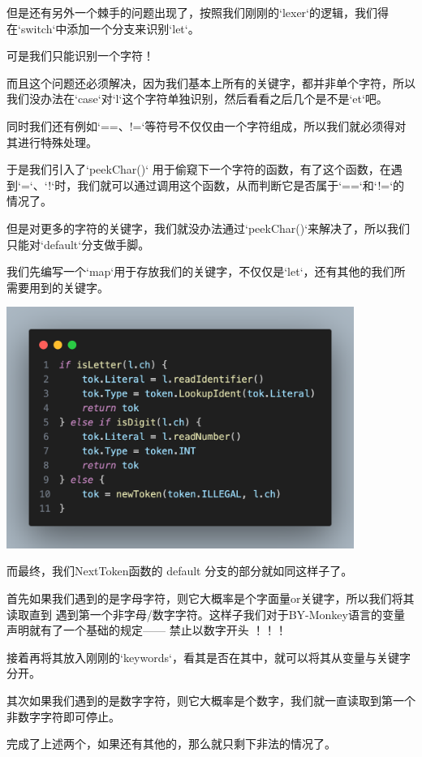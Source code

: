 \documentclass{beamer}
\begin{document}
    \begin{frame}
        但是还有另外一个棘手的问题出现了，按照我们刚刚的`lexer`的逻辑，我们得在`switch`中添加一个分支来识别`let`。

        可是我们只能识别一个字符！
        
        而且这个问题还必须解决，因为我们基本上所有的关键字，都并非单个字符，所以我们没办法在`case`对`l`这个字符单独识别，然后看看之后几个是不是`et`吧。
        
        同时我们还有例如`==、!=`等符号不仅仅由一个字符组成，所以我们就必须得对其进行特殊处理。
        
        于是我们引入了`peekChar()` 用于偷窥下一个字符的函数，有了这个函数，在遇到`=`、`!`时，我们就可以通过调用这个函数，从而判断它是否属于`==`和`!=`的情况了。
        
        但是对更多的字符的关键字，我们就没办法通过`peekChar()`来解决了，所以我们只能对`default`分支做手脚。
        
        我们先编写一个`map`用于存放我们的关键字，不仅仅是`let`，还有其他的我们所需要用到的关键字。
    \end{frame}
    \begin{frame}
        \centering
        \includegraphics[width=0.85\textwidth]{pics/lexerDefault}

        而最终，我们NextToken函数的 default 分支的部分就如同这样子了。
    \end{frame}
    \begin{frame}
        首先如果我们遇到的是字母字符，则它大概率是个字面量or关键字，所以我们将其读取直到 遇到第一个非字母/数字字符。这样子我们对于BY-Monkey语言的变量声明就有了一个基础的规定—— 禁止以数字开头 ！！！
        
        接着再将其放入刚刚的`keywords`，看其是否在其中，就可以将其从变量与关键字分开。
        
        其次如果我们遇到的是数字字符，则它大概率是个数字，我们就一直读取到第一个非数字字符即可停止。
        
        完成了上述两个，如果还有其他的，那么就只剩下非法的情况了。        
    \end{frame}
\end{document}
